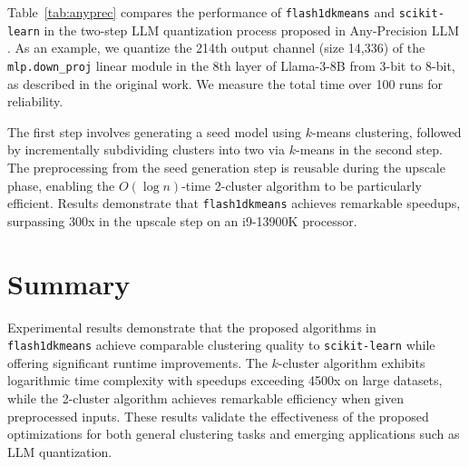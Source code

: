 \begin{table}[H]
    \centering
    \caption{Performance comparison of \texttt{flash1dkmeans} against \texttt{scikit-learn} for both $k$-cluster and 2-cluster algorithms on i9-13900K and Apple M3 processors.}
    \label{tab:anyprec}
\end{table}

Table~\ref{tab:anyprec} compares the performance of \texttt{flash1dkmeans} and \texttt{scikit-learn} in the two-step LLM quantization process proposed in Any-Precision LLM \cite{anyprec}. As an example, we quantize the 214th output channel (size 14,336) of the \texttt{mlp.down\_proj} linear module in the 8th layer of Llama-3-8B \cite{llama3} from 3-bit to 8-bit, as described in the original work. We measure the total time over 100 runs for reliability. 

The first step involves generating a seed model using $k$-means clustering, followed by incrementally subdividing clusters into two via $k$-means in the second step. The preprocessing from the seed generation step is reusable during the upscale phase, enabling the $O(\log n)$-time 2-cluster algorithm to be particularly efficient. Results demonstrate that \texttt{flash1dkmeans} achieves remarkable speedups, surpassing 300x in the upscale step on an i9-13900K processor.

\section{Summary}

Experimental results demonstrate that the proposed algorithms in \texttt{flash1dkmeans} achieve comparable clustering quality to \texttt{scikit-learn} while offering significant runtime improvements. The $k$-cluster algorithm exhibits logarithmic time complexity with speedups exceeding 4500x on large datasets, while the 2-cluster algorithm achieves remarkable efficiency when given preprocessed inputs. These results validate the effectiveness of the proposed optimizations for both general clustering tasks and emerging applications such as LLM quantization.
